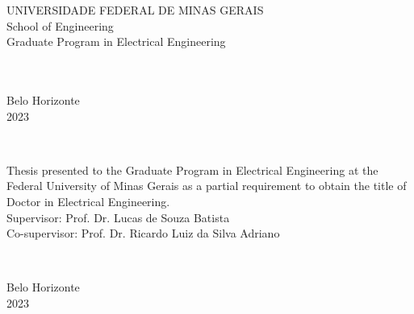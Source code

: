 \documentclass[12pt,a4paper,oneside]{book}
\begin{document}
    
    \begin{titlepage}

        \begin{center}
            \begin{spacing}{1}
                UNIVERSIDADE FEDERAL DE MINAS GERAIS \\
                School of Engineering \\
                Graduate Program in Electrical Engineering
            \end{spacing}
            \vspace{5cm}
            \theauthor \\
            \vspace{5cm}
            \textbf{\MakeUppercase\thetitle}\\
            \vspace*{\fill}
            Belo Horizonte\\2023
        \end{center}

	\end{titlepage}

	\newpage
	\thispagestyle{empty}
	\begin{center}
		\theauthor\\
		\vspace{5cm}
		\textbf{\thetitle}
	\end{center}
	\vspace{5cm}
	\hfill
	\begin{minipage}{8cm}
		Thesis presented to the Graduate Program in Electrical Engineering at the Federal University of Minas Gerais as a partial requirement to obtain the title of Doctor in Electrical Engineering.\\[3mm]
		Supervisor: Prof. Dr. Lucas de Souza Batista \\[3mm]
		Co-supervisor: Prof. Dr. Ricardo Luiz da Silva Adriano
	\end{minipage}\\
	\begin{center}
		\vspace*{\fill}
		Belo Horizonte\\2023
	\end{center}

    

    
\end{document}
